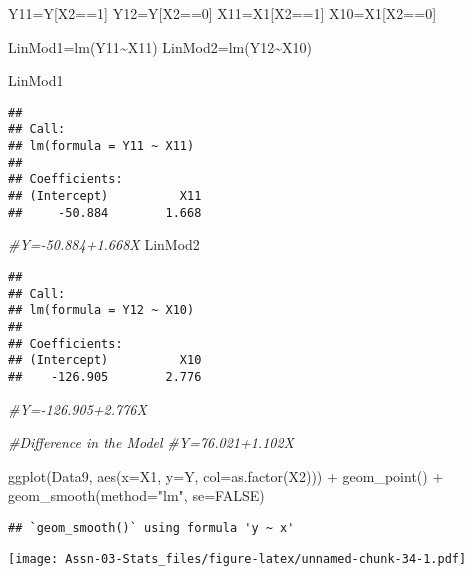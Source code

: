 \documentclass[
]{article}
\newenvironment{Shaded}{\begin{snugshade}}{\end{snugshade}}
\newcommand{\AttributeTok}[1]{\textcolor[rgb]{0.77,0.63,0.00}{#1}}
\newcommand{\CommentTok}[1]{\textcolor[rgb]{0.56,0.35,0.01}{\textit{#1}}}
\newcommand{\ConstantTok}[1]{\textcolor[rgb]{0.00,0.00,0.00}{#1}}
\newcommand{\DecValTok}[1]{\textcolor[rgb]{0.00,0.00,0.81}{#1}}
\newcommand{\FunctionTok}[1]{\textcolor[rgb]{0.00,0.00,0.00}{#1}}
\newcommand{\NormalTok}[1]{#1}
\newcommand{\OtherTok}[1]{\textcolor[rgb]{0.56,0.35,0.01}{#1}}
\newcommand{\SpecialCharTok}[1]{\textcolor[rgb]{0.00,0.00,0.00}{#1}}
\newcommand{\StringTok}[1]{\textcolor[rgb]{0.31,0.60,0.02}{#1}}
\begin{document}
\begin{Shaded}
\begin{Highlighting}[]
\NormalTok{Y11}\OtherTok{=}\NormalTok{Y[X2}\SpecialCharTok{==}\DecValTok{1}\NormalTok{]}
\NormalTok{Y12}\OtherTok{=}\NormalTok{Y[X2}\SpecialCharTok{==}\DecValTok{0}\NormalTok{]}
\NormalTok{X11}\OtherTok{=}\NormalTok{X1[X2}\SpecialCharTok{==}\DecValTok{1}\NormalTok{]}
\NormalTok{X10}\OtherTok{=}\NormalTok{X1[X2}\SpecialCharTok{==}\DecValTok{0}\NormalTok{]}

\NormalTok{LinMod1}\OtherTok{=}\FunctionTok{lm}\NormalTok{(Y11}\SpecialCharTok{\textasciitilde{}}\NormalTok{X11)}
\NormalTok{LinMod2}\OtherTok{=}\FunctionTok{lm}\NormalTok{(Y12}\SpecialCharTok{\textasciitilde{}}\NormalTok{X10)}

\NormalTok{LinMod1}
\end{Highlighting}
\end{Shaded}

\begin{verbatim}
## 
## Call:
## lm(formula = Y11 ~ X11)
## 
## Coefficients:
## (Intercept)          X11  
##     -50.884        1.668
\end{verbatim}

\begin{Shaded}
\begin{Highlighting}[]
\CommentTok{\#Y={-}50.884+1.668X}
\NormalTok{LinMod2}
\end{Highlighting}
\end{Shaded}

\begin{verbatim}
## 
## Call:
## lm(formula = Y12 ~ X10)
## 
## Coefficients:
## (Intercept)          X10  
##    -126.905        2.776
\end{verbatim}

\begin{Shaded}
\begin{Highlighting}[]
\CommentTok{\#Y={-}126.905+2.776X}

\CommentTok{\#Difference in the Model}
\CommentTok{\#Y=76.021+1.102X}

\FunctionTok{ggplot}\NormalTok{(Data9, }\FunctionTok{aes}\NormalTok{(}\AttributeTok{x=}\NormalTok{X1, }\AttributeTok{y=}\NormalTok{Y, }\AttributeTok{col=}\FunctionTok{as.factor}\NormalTok{(X2))) }\SpecialCharTok{+} \FunctionTok{geom\_point}\NormalTok{() }\SpecialCharTok{+}
            \FunctionTok{geom\_smooth}\NormalTok{(}\AttributeTok{method=}\StringTok{"lm"}\NormalTok{, }\AttributeTok{se=}\ConstantTok{FALSE}\NormalTok{)}
\end{Highlighting}
\end{Shaded}

\begin{verbatim}
## `geom_smooth()` using formula 'y ~ x'
\end{verbatim}

\texttt{[image: Assn-03-Stats\_files/figure-latex/unnamed-chunk-34-1.pdf]}
\end{document}
